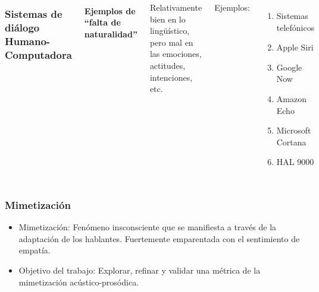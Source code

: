 \begin{frame}
  \begin{columns}
    \frametitle{Sistemas de diálogo Humano-Computadora}
    \framesubtitle{Ejemplos de ``falta de naturalidad''}

    Relativamente bien en lo lingüístico, pero mal en las emociones, actitudes, intenciones, etc.

    Ejemplos:
    \begin{enumerate}
      \item Sistemas telefónicos
      \item Apple Siri
      \item Google Now
      \item Amazon Echo
      \item Microsoft Cortana
      \item HAL 9000
    \end{enumerate}
    \begin{figure}
      \includegraphics[scale=0.35]{images/hal.jpg}
    \end{figure}
  \end{columns}
\end{frame}

\begin{frame}
  \frametitle{Mimetización}
  \begin{itemize}
    \item Mimetización: Fenómeno insconsciente que se manifiesta a través de la adaptación de los hablantes. Fuertemente emparentada con el sentimiento de empatía.
    \item Objetivo del trabajo: Explorar, refinar y validar una métrica de la mimetización acústico-prosódica.
  \end{itemize}

\end{frame}

